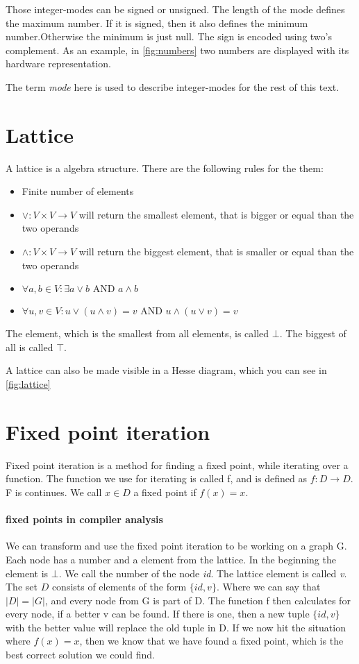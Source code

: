 Those integer-modes can be signed or unsigned. The length of the mode defines the maximum number. If it is signed, then it also defines the minimum number.Otherwise the minimum is just null. The sign is encoded using two's complement. As an example, in \autoref{fig:numbers} two numbers are displayed with its hardware representation.

The term \textit{mode} here is used to describe integer-modes for the rest of this text.

\section{Lattice}
A lattice is a algebra structure. There are the following rules for the them:
\begin{itemize}
	\item Finite number of elements
	\item $\vee: V \times V \rightarrow V$ will return the smallest element, that is bigger or equal than the two operands
	\item $\wedge: V \times V \rightarrow V$ will return the biggest element, that is smaller or equal than the two operands
	\item $\forall a,b \in V : \exists a \vee b \text{ AND } a \wedge b$
	\item $\forall u,v \in V : u \vee ( u \wedge v) = v \text{ AND } u \wedge ( u \vee v ) = v$
\end{itemize}

The element, which is the smallest from all elements, is called $\bot$. The biggest of all is called $\top$.

A lattice can also be made visible in a Hesse diagram, which you can see in \autoref{fig:lattice}

\section{Fixed point iteration}

Fixed point iteration is a method for finding a fixed point, while iterating over a function. \newline
The function we use for iterating is called f, and is defined as $f: D \rightarrow D$. F is continues. We call $x \in D$ a fixed point if $f(x)=x$.

\paragraph{fixed points in compiler analysis}
We can transform and use the fixed point iteration to be working on a graph G. Each node has a number and a element from the lattice. In the beginning the element is $\bot$. We call the number of the node \textit{id}. The lattice element is called \textit{v}.
The set $D$ consists of elements of the form $\{id, v\}$. Where we can say that $|D| = |G|$, and every node from G is part of D.
The function f then calculates for every node, if a better v can be found. If there is one, then a new tuple $\{id, v\}$ with the better value will replace the old tuple in D.
If we now hit the situation where $f(x) = x$, then we know that we have found a fixed point, which is the best correct solution we could find.